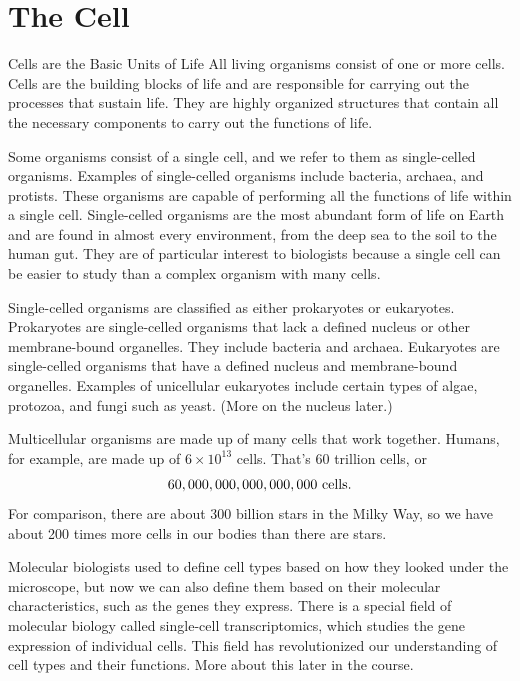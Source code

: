 \section{The Cell}

Cells are the Basic Units of Life
\reversemarginpar
{}
\normalmarginpar
All living organisms consist of one or more cells. Cells are the building blocks of life and are responsible for carrying out the processes that sustain life. They are highly organized structures that contain all the necessary components to carry out the functions of life. 

Some organisms consist of a single cell, and we refer to them as single-celled organisms. Examples of single-celled organisms include bacteria, archaea, and protists. These organisms are capable of performing all the functions of life within a single cell. Single-celled organisms are the most abundant form of life on Earth and are found in almost every environment, from the deep sea to the soil to the human gut. They are of particular interest to biologists because a single cell can be easier to study than a complex organism with many cells. 

Single-celled organisms are classified as either prokaryotes or eukaryotes. Prokaryotes are single-celled organisms that lack a defined nucleus or other membrane-bound organelles. They include bacteria and archaea. Eukaryotes are single-celled organisms that have a defined nucleus and membrane-bound organelles. Examples of unicellular eukaryotes include certain types of algae, protozoa, and fungi such as yeast. (More on the nucleus later.)

Multicellular organisms are made up of many cells that work together. Humans, for example, are made up of \(6 \times 10^{13}\) cells. That's 60 trillion cells, or
$$ 60,000,000,000,000,000 {\ \rm cells}. $$
For comparison, there are about 300 billion stars in the Milky Way, so we have about 200 times more cells in our bodies than there are stars.

Molecular biologists used to define cell types based on how they looked under the microscope, but now we can also define them based on their molecular characteristics, such as the genes they express. There is a special field of molecular biology called single-cell transcriptomics, which studies the gene expression of individual cells. This field has revolutionized our understanding of cell types and their functions. More about this later in the course.

